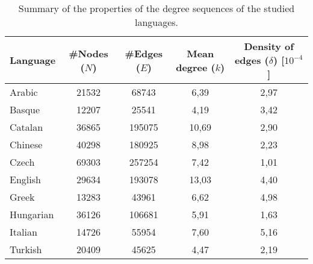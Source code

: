 \begin{table}[!htb]
    \centering
    \begin{tabular}{l c c c c} \toprule
        \textbf{Language} & \textbf{\#Nodes} ($N$) & \textbf{\#Edges} ($E$) & \textbf{Mean degree} ($k$) & \textbf{Density of edges} ($\delta$) [$10^{-4}$]  \\ \midrule
         Arabic & 21532 & 68743 & 6,39 & 2,97 \\ 
         Basque & 12207 & 25541 & 4,19 & 3,42 \\
         Catalan & 36865 & 195075 & 10,69 & 2,90 \\ 
         Chinese & 40298 & 180925 & 8,98 & 2,23\\ 
         Czech & 69303 & 257254 & 7,42 & 1,01 \\ 
         English & 29634 & 193078 & 13,03 & 4,40 \\ 
         Greek & 13283 & 43961 & 6,62 & 4,98 \\ 
         Hungarian & 36126 & 106681 & 5,91 & 1,63 \\ 
         Italian & 14726 & 55954 & 7,60 & 5,16 \\
         Turkish & 20409 & 45625 & 4,47 & 2,19 \\ \bottomrule
    \end{tabular}
    \caption{Summary of the properties of the degree sequences of the studied languages.}
    \label{tab:1}
\end{table}